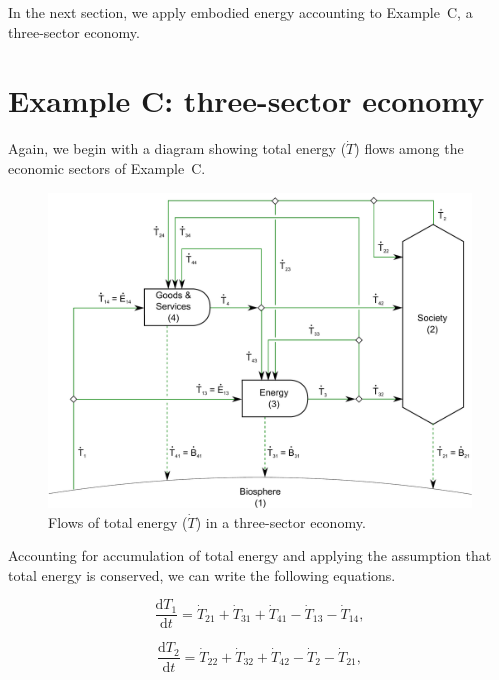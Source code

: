 In the next section, we apply embodied energy accounting to 
Example~C, a three-sector economy.


\section{Example C: three-sector economy}

Again, we begin with a diagram showing total energy ($\dot{T}$) flows
among the economic sectors of Example~C.

\begin{figure}[h!]
\includegraphics[width=1.0\linewidth]{Part_2/Chapter_Embodied/images/3_sector_embodied_energy.pdf}
\caption{Flows of total energy ($\dot{T}$) in a three-sector economy.}
\label{fig:C_total_energy}
\end{figure}

Accounting for accumulation of total energy and 
applying the assumption that total energy is conserved, 
we can write the following equations.

\begin{equation} \label{eq:C-CV_T_1}
	\frac{\mathrm{d}T_{1}}{\mathrm{d}t} 	 
	= \dot{T}_{21} 
	+ \dot{T}_{31} 
	+ \dot{T}_{41} 
	- \dot{T}_{13} 
	- \dot{T}_{14},
\end{equation}

\begin{equation} \label{eq:C-CV_T_2}
	\frac{\mathrm{d}T_{2}}{\mathrm{d}t} 	 
	= \dot{T}_{22}
	+ \dot{T}_{32} 
	+ \dot{T}_{42} 
	- \dot{T}_{2}
	- \dot{T}_{21},
\end{equation}

